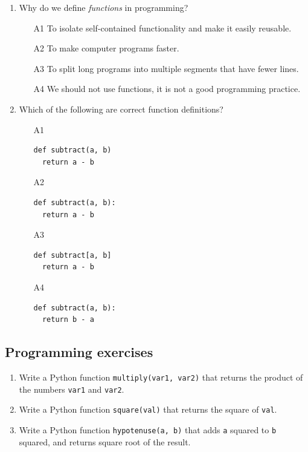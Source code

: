 \begin{enumerate}
\item Why do we define {\em functions} in programming? 
\begin{enumerate}
\item[A1] To isolate self-contained functionality and make it easily reusable.
\item[A2] To make computer programs faster.
\item[A3] To split long programs into multiple segments that have fewer lines.
\item[A4] We should not use functions, it is not a good programming practice.
\end{enumerate}
\item Which of the following are correct function definitions?
\begin{enumerate}
\item[A1] 
\begin{verbatim}
def subtract(a, b)
  return a - b
\end{verbatim}
\item[A2] 
\begin{verbatim}
def subtract(a, b):
  return a - b
\end{verbatim}
\item[A3] 
\begin{verbatim}
def subtract[a, b]
  return a - b
\end{verbatim}
\item[A4] 
\begin{verbatim}
def subtract(a, b):
  return b - a
\end{verbatim}
\end{enumerate}
\end{enumerate}

\subsection{Programming exercises}

\begin{enumerate}
\item Write a Python function {\tt multiply(var1, var2)} that returns the product of the 
      numbers {\tt var1} and {\tt var2}.
\item Write a Python function {\tt square(val)} that returns the square of {\tt val}.
\item Write a Python function {\tt hypotenuse(a, b)} that adds {\tt a} squared to {\tt b} squared,
      and returns square root of the result.
\end{enumerate}

